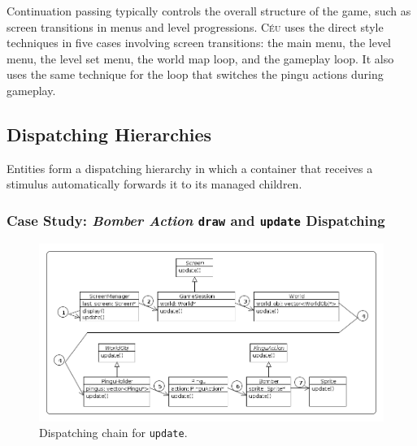\documentclass{vgtc}                          %
\newcommand{\CEU}{\textsc{C\'{e}u}\xspace}
\newcommand{\code}[1] {{\small{\texttt{#1}}}}
\newcommand{\Code}[1] {{\texttt{#1}}}
\begin{document}
Continuation passing typically controls the overall structure of the game,
such as screen transitions in menus and level progressions.
%
\CEU uses the direct style techniques in five cases involving screen
transitions:
the main menu, the level menu, the level set menu, the world map loop, and
the gameplay loop.
%
It also uses the same technique for the loop that switches the pingu actions
during gameplay.

\subsection{Dispatching Hierarchies}
\label{sec.pats.dispatching}

    Entities form a dispatching hierarchy in which a container that receives a
    stimulus automatically forwards it to its managed children.

\subsubsection{Case Study: \emph{Bomber Action} \Code{draw} and \Code{update} Dispatching}

\begin{figure}[t]
\centering
\includegraphics[width=\columnwidth]{hierarchy}
\caption{Dispatching chain for \code{update}.
\label{fig.hier}
}
\end{figure}
\end{document}
